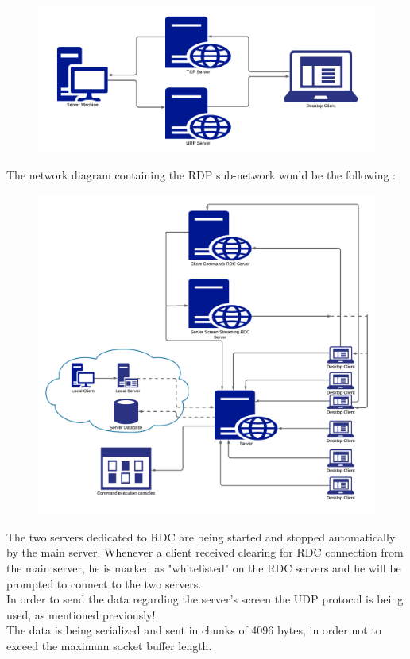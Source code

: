 \documentclass[runningheads]{llncs}
\begin{document}
\begin{figure}[H]
\centering
\includegraphics[width=150mm]{RDC Network Diagram.png}
\end{figure}

The network diagram containing the RDP sub-network would be the following :

\begin{figure}[H]
\centering
\includegraphics[width=150mm]{Network Diagram with RDC.png}
\end{figure}

The two servers dedicated to RDC are being started and stopped automatically by the main server. Whenever a client received clearing for RDC connection from the main server, he is marked as "whitelisted" on the RDC servers and he will be prompted to connect to the two servers.\\
In order to send the data regarding the server's screen the UDP protocol is being used, as mentioned previously!\\
The data is being serialized and sent in chunks of 4096 bytes, in order not to exceed the maximum socket buffer length.
\end{document}
